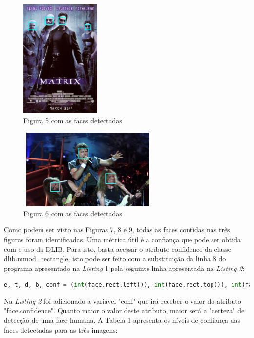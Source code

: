 \documentclass[conference]{IEEEtran}
\begin{document}
	    \begin{figure}[h!b]
			\centering \includegraphics[width=4cm,height=6cm]{matrix_detectada.png}
			\caption{Figura 5 com as faces detectadas} 
		\end{figure}

         \begin{figure}[h!b]
			\centering \includegraphics[width=7cm,height=4cm]{iron_detectada.png}
			\caption{Figura 6 com as faces detectadas} 
		\end{figure}
		
        Como podem ser visto nas Figuras 7, 8 e 9, todas as faces contidas nas três figuras foram identificadas. Uma métrica útil é a confiança que pode ser obtida com o uso da DLIB. Para isto, basta acessar o atributo confidence da classe dlib.mmod\_rectangle, isto pode ser feito com a substituição da linha 8 do programa apresentado na \textit{Listing} 1 pela seguinte linha apresentada na \textit{Listing 2}:
        
		\begin{lstlisting}[breaklines=true, language=Python, caption=Código para descobrir a confiança no DLIB]
    e, t, d, b, conf = (int(face.rect.left()), int(face.rect.top()), int(face.rect.right()), int(face.rect.bottom()), face.confidence)\end{lstlisting}

        Na \textit{Listing 2} foi adicionado a variável "conf" que irá receber o valor do atributo "face.confidence". Quanto maior o valor deste atributo, maior será a "certeza" de detecção de uma face humana. A Tabela 1 apresenta os níveis de confiança das faces detectadas para as três imagens:
        
\end{document}
